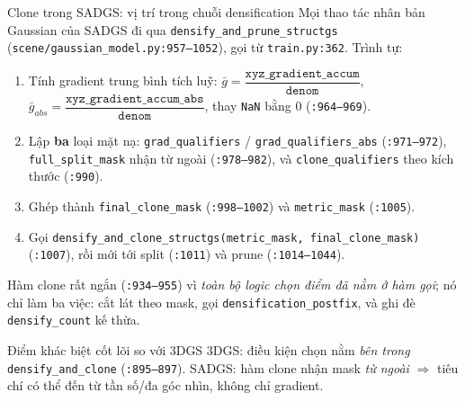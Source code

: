 
\begin{frame}{Clone trong SADGS: vị trí trong chuỗi densification}
\footnotesize
Mọi thao tác nhân bản Gaussian của SADGS đi qua \texttt{densify\_and\_prune\_structgs} (\texttt{scene/gaussian\_model.py:957--1052}), gọi từ \texttt{train.py:362}. Trình tự:
\begin{enumerate}
\item Tính gradient trung bình tích luỹ: $\bar g = \dfrac{\texttt{xyz\_gradient\_accum}}{\texttt{denom}}$, $\bar g_{abs} = \dfrac{\texttt{xyz\_gradient\_accum\_abs}}{\texttt{denom}}$, thay \texttt{NaN} bằng 0 (\texttt{:964--969}).
\item Lập \textbf{ba} loại mặt nạ: \texttt{grad\_qualifiers} / \texttt{grad\_qualifiers\_abs} (\texttt{:971--972}), \texttt{full\_split\_mask} nhận từ ngoài (\texttt{:978--982}), và \texttt{clone\_qualifiers} theo kích thước (\texttt{:990}).
\item Ghép thành \texttt{final\_clone\_mask} (\texttt{:998--1002}) và \texttt{metric\_mask} (\texttt{:1005}).
\item Gọi \texttt{densify\_and\_clone\_structgs(metric\_mask, final\_clone\_mask)} (\texttt{:1007}), rồi mới tới split (\texttt{:1011}) và prune (\texttt{:1014--1044}).
\end{enumerate}
Hàm clone rất ngắn (\texttt{:934--955}) vì \emph{toàn bộ logic chọn điểm đã nằm ở hàm gọi}; nó chỉ làm ba việc: cắt lát theo mask, gọi \texttt{densification\_postfix}, và ghi đè \texttt{densify\_count} kế thừa.
\vspace{2pt}
\begin{block}{\footnotesize Điểm khác biệt cốt lõi so với 3DGS}
3DGS: điều kiện chọn nằm \emph{bên trong} \texttt{densify\_and\_clone} (\texttt{:895--897}). SADGS: hàm clone nhận mask \emph{từ ngoài} $\Rightarrow$ tiêu chí có thể đến từ tần số/đa góc nhìn, không chỉ gradient.
\end{block}
\end{frame}



